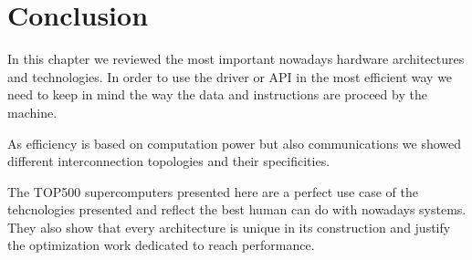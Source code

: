 \section{Conclusion}

In this chapter we reviewed the most important nowadays hardware architectures and technologies. 
In order to use the driver or API in the most efficient way we need to keep in mind the way the data and instructions are proceed by the machine. 

As efficiency is based on computation power but also communications we showed different interconnection topologies and their specificities. 

The TOP500 supercomputers presented here are a perfect use case of the tehcnologies presented and reflect the best human can do with nowadays systems.
They also show that every architecture is unique in its construction and justify the optimization work dedicated to reach performance.   